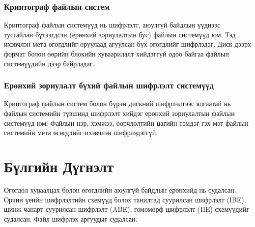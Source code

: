 \subsubsection*{Криптограф файлын систем}
Криптограф файлын системүүд нь шифрлэлт, аюулгүй байдлын үүднээс тусгайлан бүтээгдсэн (ерөнхий зориулалтын бус) файлын системүүд юм. Тэд ихэвчлэн мета өгөгдлийг оруулаад агуулсан бүх өгөгдлийг шифрлэдэг. Диск дээрх формат болон өөрийн блокийн хуваарилалт хийдэггүй одоо байгаа файлын системүүдийн дээр байрладаг.

\subsubsection*{Ерөнхий зориулалт бүхий файлын шифрлэлт системүүд}
Криптограф файлын систем болон бүрэн дискний шифрлэлтээс ялгаатай нь файлын системийн түвшинд шифрлэлт хийдэг ерөнхий зориулалтын файлын системүүд юм. Файлын нэр, хэмжээ, өөрчлөлтийн цагийн тэмдэг гэх мэт файлын системийн мета өгөгдлийг ихэвчлэн шифрлэдэггүй.


\section{Бүлгийн Дүгнэлт}
Өгөгдөл хуваалцах болон өгөгдлийн аюулгүй байдлын ерөнхийд нь судалсан. Орчин үеийн шифрлэлтийн схемүүд болох танилтад суурилсан шифрлэлт (IBE), шинж чанарт суурилсан шифрлэлт (ABE), гомоморф шифрлэлт (HE) схемүүдийг судалсан. Файл шифрлэх аргуудыг судалсан.